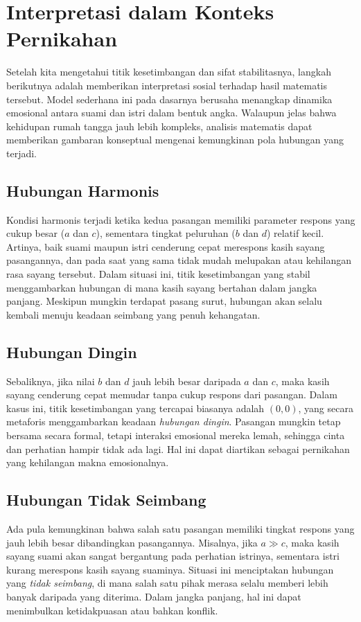 \documentclass{bukumjh}
\begin{document}
\section{Interpretasi dalam Konteks Pernikahan}

Setelah kita mengetahui titik kesetimbangan dan sifat stabilitasnya, langkah berikutnya adalah memberikan interpretasi sosial terhadap hasil matematis tersebut. 
Model sederhana ini pada dasarnya berusaha menangkap dinamika emosional antara suami dan istri dalam bentuk angka. 
Walaupun jelas bahwa kehidupan rumah tangga jauh lebih kompleks, analisis matematis dapat memberikan gambaran konseptual mengenai kemungkinan pola hubungan yang terjadi.

\subsection*{Hubungan Harmonis}
Kondisi harmonis terjadi ketika kedua pasangan memiliki parameter respons yang cukup besar ($a$ dan $c$), sementara tingkat peluruhan ($b$ dan $d$) relatif kecil. 
Artinya, baik suami maupun istri cenderung cepat merespons kasih sayang pasangannya, dan pada saat yang sama tidak mudah melupakan atau kehilangan rasa sayang tersebut. 
Dalam situasi ini, titik kesetimbangan yang stabil menggambarkan hubungan di mana kasih sayang bertahan dalam jangka panjang. 
Meskipun mungkin terdapat pasang surut, hubungan akan selalu kembali menuju keadaan seimbang yang penuh kehangatan.

\subsection*{Hubungan Dingin}
Sebaliknya, jika nilai $b$ dan $d$ jauh lebih besar daripada $a$ dan $c$, maka kasih sayang cenderung cepat memudar tanpa cukup respons dari pasangan. 
Dalam kasus ini, titik kesetimbangan yang tercapai biasanya adalah $(0,0)$, yang secara metaforis menggambarkan keadaan \emph{hubungan dingin}. 
Pasangan mungkin tetap bersama secara formal, tetapi interaksi emosional mereka lemah, sehingga cinta dan perhatian hampir tidak ada lagi. 
Hal ini dapat diartikan sebagai pernikahan yang kehilangan makna emosionalnya.

\subsection*{Hubungan Tidak Seimbang}
Ada pula kemungkinan bahwa salah satu pasangan memiliki tingkat respons yang jauh lebih besar dibandingkan pasangannya. 
Misalnya, jika $a \gg c$, maka kasih sayang suami akan sangat bergantung pada perhatian istrinya, sementara istri kurang merespons kasih sayang suaminya. 
Situasi ini menciptakan hubungan yang \emph{tidak seimbang}, di mana salah satu pihak merasa selalu memberi lebih banyak daripada yang diterima. 
Dalam jangka panjang, hal ini dapat menimbulkan ketidakpuasan atau bahkan konflik.
\end{document}

